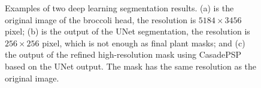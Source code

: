 \begin{figure}[htbp!]
  \begin{center}
  \end{center}
  \caption[Two deep learning segmentation results]{
    Examples of two deep learning segmentation results. (a) is the original image of the broccoli head, the resolution is $5184 \times 3456$ pixel; (b) is the output of the UNet segmentation, the resolution is $256 \times 256$ pixel, which is not enough as final plant masks; and (c) the output of the refined high-resolution mask using CasadePSP based on the UNet output. The mask has the same resolution as the original image.
  }
  \label{fig:des_dl_seg}
\end{figure}